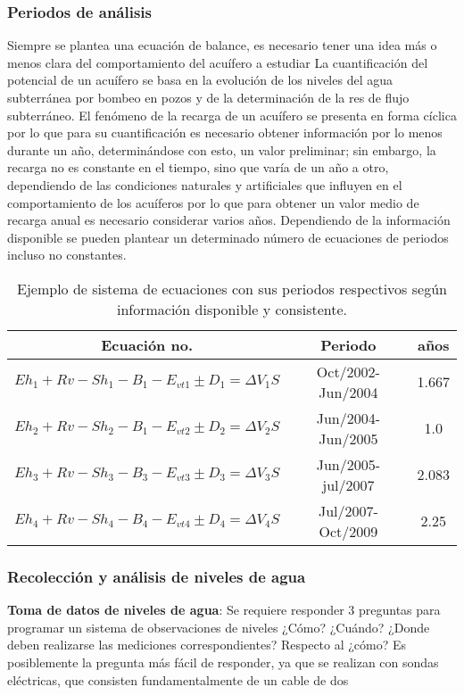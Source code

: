 \subsubsection{Periodos de análisis}
Siempre se plantea una ecuación de balance, es necesario tener una idea más o menos clara del comportamiento del acuífero a estudiar La cuantificación del potencial de un acuífero se basa en la evolución de los niveles del agua subterránea por bombeo en pozos y de la determinación de la res de flujo subterráneo. El fenómeno de la recarga de un acuífero se presenta en forma cíclica por lo que para su cuantificación es necesario obtener información por lo menos durante un año, determinándose con esto, un valor preliminar; sin embargo, la recarga no es constante en el tiempo, sino que varía de un año a otro, dependiendo de las condiciones naturales y artificiales que influyen en el comportamiento de los acuíferos por lo que para obtener un valor medio de recarga anual es necesario considerar varios años. Dependiendo de la información disponible se pueden plantear un determinado número de ecuaciones de periodos incluso no constantes.
\begin{table}[h!]
    \centering
    \begin{tabular}{@{}ccc@{}}
    \toprule
    Ecuación no.                                  & Periodo           & años  \\ \midrule
    $Eh_1+Rv-Sh_1-B_1-E_{vt1}\pm D_1=\Delta V_1S$ & Oct/2002-Jun/2004 & 1.667 \\
    $Eh_2+Rv-Sh_2-B_1-E_{vt2}\pm D_2=\Delta V_2S$ & Jun/2004-Jun/2005 & 1.0   \\
    $Eh_3+Rv-Sh_3-B_3-E_{vt3}\pm D_3=\Delta V_3S$ & Jun/2005-jul/2007 & 2.083 \\
    $Eh_4+Rv-Sh_4-B_4-E_{vt4}\pm D_4=\Delta V_4S$ & Jul/2007-Oct/2009 & 2.25 \\ \bottomrule
    \end{tabular}
    \caption{Ejemplo de sistema de ecuaciones con sus periodos respectivos según información disponible y consistente.}
    \label{tabgh14}
\end{table}
\subsubsection{Recolección y análisis de niveles de agua}
\textbf{Toma de datos de niveles de agua}:
Se requiere responder 3 preguntas para programar un sistema de observaciones de niveles ¿Cómo? ¿Cuándo? ¿Donde deben realizarse las mediciones correspondientes? Respecto al ¿cómo? Es posiblemente la pregunta más fácil de responder, ya que se realizan con sondas eléctricas, que consisten fundamentalmente de un cable de dos

